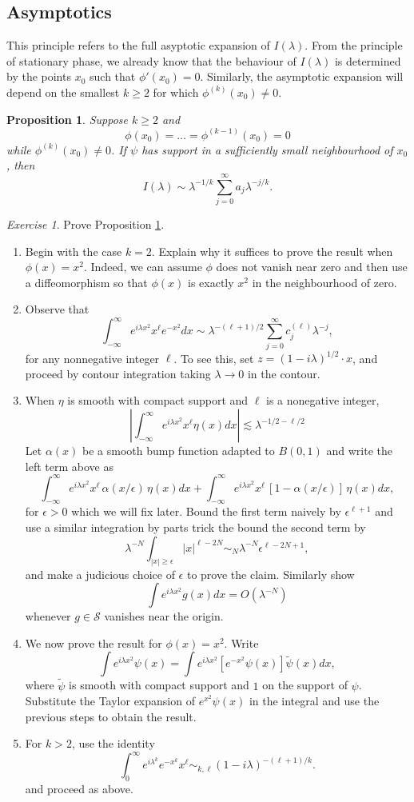 \documentclass[11pt]{article}
\newtheorem{prop}[thm]{Proposition}
\theoremstyle{remark}
\newtheorem{exr}{Exercise}
\newcommand{\calS}{\mathcal{S}}
\newcommand{\1}{\textbf{1}}
\newcommand{\lle}{\lesssim}
\begin{document}
\subsection*{Asymptotics}
This principle refers to the full asyptotic expansion of $I(\lambda)$. From the principle of stationary phase, we already know that the behaviour of $I(\lambda)$ is determined by the points $x_0$ such that $\phi'(x_0) = 0$. Similarly, the asymptotic expansion will depend on the smallest $k \geq 2$ for which $\phi^{(k)}(x_0) \neq 0$.
\begin{prop}
Suppose $k \geq 2$ and
\[
\phi(x_0) = \ldots = \phi^{(k-1)}(x_0) = 0
\]
while $\phi^{(k)}(x_0) \neq 0$. If $\psi$ has support in a sufficiently small neighbourhood of $x_0$, then
\[
I(\lambda) \sim \lambda^{-1/k} \sum_{j=0}^\infty a_j \lambda^{-j/k}.
\]
\label{prop:asymp}
\end{prop}
\begin{exr}
Prove Proposition \ref{prop:asymp}.
\begin{enumerate}
\item Begin with the case $k = 2$. Explain why it suffices to prove the result when $\phi(x) = x^2$. Indeed, we can assume $\phi$ does not vanish near zero and then use a diffeomorphism so that $\phi(x)$ is exactly $x^2$ in the neighbourhood of zero.
\item Observe that
\[
\int_{-\infty}^\infty e^{i \lambda x^2} x^\ell e^{-x^2} dx \sim \lambda^{-(\ell +1)/2} \sum_{j=0}^\infty c_j^{(\ell)} \lambda^{-j},
\]
for any nonnegative integer $\ell$. To see this, set $z = (1 - i\lambda)^{1/2} \cdot x$, and proceed by contour integration taking $\lambda \to 0$ in the contour.
\item When $\eta$ is smooth with compact support and $\ell$ is a nonegative integer,
\[
\left| \int_{-\infty}^\infty e^{i \lambda x^2} x^\ell \eta(x) dx \right| \lle \lambda^{-1/2 - \ell/2}
\]
Let $\alpha(x)$ be a smooth bump function adapted to $B(0,1)$ and write the left term above as 
\[
\int_{-\infty}^\infty e^{i \lambda x^2} x^\ell \,\alpha(x/\epsilon) \,\eta(x)  dx  + \int_{-\infty}^\infty e^{i \lambda x^2} x^\ell \,[1- \alpha(x/\epsilon)]\, \eta(x)  dx ,
\]
for $\epsilon > 0$ which we will fix later. Bound the first term naively by $\epsilon^{\ell + 1}$ and use a similar integration by parts trick the bound the second term by
\[
\lambda^{-N} \int_{|x| \geq \epsilon} |x|^{\ell - 2N} \sim_N \lambda^{-N} \epsilon^{\ell - 2N + 1},
\]
and make a judicious choice of $\epsilon$ to prove the claim. Similarly show
\[
\int e^{i \lambda x^2} g(x) dx  = O(\lambda^{-N})
\]
whenever $g \in \calS$ vanishes near the origin.
\item We now prove the result for $\phi(x) = x^2$. Write
\[
\int e^{i \lambda x^2} \psi(x) = \int e^{i \lambda x^2} [e^{-x^2} \psi(x)] \tilde{\psi}(x) dx,
\]
where $\tilde{\psi}$ is smooth with compact support and $1$ on the support of $\psi$. Substitute the Taylor expansion of $e^{x^2} \psi(x)$ in the integral and use the previous steps to obtain the result.
\item For $k > 2$, use the identity
\[
\int_0^\infty e^{i \lambda^k} e^{-x^k} x^\ell \sim_{k, \ell} (1-i \lambda)^{-(\ell + 1) / k}.
\]
and proceed as above.
\end{enumerate}
\end{exr}
\end{document}
